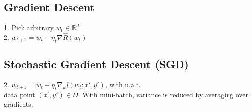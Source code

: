 \subsection*{Gradient Descent}
1. Pick arbitrary $w_0 \in \mathbb{R}^d$\\
2. $w_{t+1} = w_t - \eta_t \nabla \hat{R}(w_t)$

\subsection*{Stochastic Gradient Descent (SGD)}
2. $w_{t+1} = w_t - \eta_t \nabla_w l(w_t;x',y')$, with u.a.r.\\ data point $(x',y') \in D$. With mini-batch, variance is reduced by averaging over gradients. 
